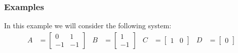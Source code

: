 \subsubsection{Examples}
In this example we will consider the following system:
\begin{align*}
	A &= \begin{bmatrix} 0 & 1 \\ -1 & -1 \end{bmatrix} &
	B &= \begin{bmatrix} 1 \\ -1 \end{bmatrix} &
	C &= \begin{bmatrix} 1 & 0 \end{bmatrix} &
	D &= \begin{bmatrix} 0 \end{bmatrix} 
\end{align*}

